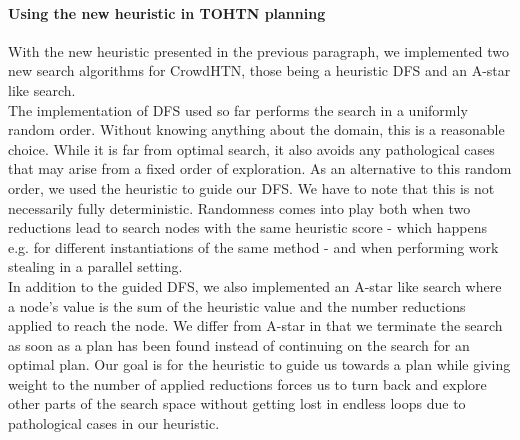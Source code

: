 \paragraph{Using the new heuristic in TOHTN planning}
With the new heuristic presented in the previous paragraph, we implemented two new search algorithms for CrowdHTN, those being a heuristic DFS and an A-star like search. \\
The implementation of DFS used so far performs the search in a uniformly random order. Without knowing anything about the domain, this is a reasonable choice. While it is far from optimal search, it also avoids any pathological cases that may arise from a fixed order of exploration. As an alternative to this random order, we used the heuristic to guide our DFS. We have to note that this is not necessarily fully deterministic. Randomness comes into play both when two reductions lead to search nodes with the same heuristic score - which happens e.g. for different instantiations of the same method - and when performing work stealing in a parallel setting. \\
In addition to the guided DFS, we also implemented an A-star like search where a node's value is the sum of the heuristic value and the number reductions applied to reach the node. We differ from A-star in that we terminate the search as soon as a plan has been found instead of continuing on the search for an optimal plan. Our goal is for the heuristic to guide us towards a plan while giving weight to the number of applied reductions forces us to turn back and explore other parts of the search space without getting lost in endless loops due to pathological cases in our heuristic.

